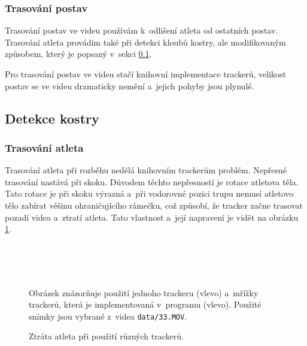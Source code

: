 \subsubsection{Trasování postav}

Trasování postav ve videu používám k~odlišení atleta od ostatních postav. Trasování atleta provádím také při detekci kloubů kostry, ale modifikovaným způsobem, který je popsaný v~sekci \ref{ssec:ndetekce}.

Pro trasování postav ve videu stačí knihovní implementace trackerů, velikost postav se ve videu dramaticky nemění a~jejich pohyby jsou plynulé.



\subsection{Detekce kostry}
\label{ssec:ndetekce}

\subsubsection{Trasování atleta}

Trasování atleta při rozběhu nedělá knihovním trackerům problém. Nepřesné trasování nastává při skoku. Důvodem těchto nepřesností je rotace atletova těla. Tato rotace je při skoku výrazná a~při vodorovné pozici trupu nemusí atletovo tělo zabírat věšinu ohraničujícího rámečku, což způsobí, že tracker začne trasovat pozadí videa a~ztratí atleta. Tato vlastnost a~její napravení je vidět na obrázku \ref{fig:ztrata}.

\begin{figure}[p]\centering
     \\
     \\
     \\
    \caption{Ztráta atleta při použití různých trackerů.}
    \small
    Obrázek znázorňuje použití jednoho trackeru (vlevo) a~mřížky trackerů, která je implementovaná v~programu (vlevo). Použité snímky jsou vybrané z~videa \texttt{data/33.MOV}.
    \label{fig:ztrata}
\end{figure}

